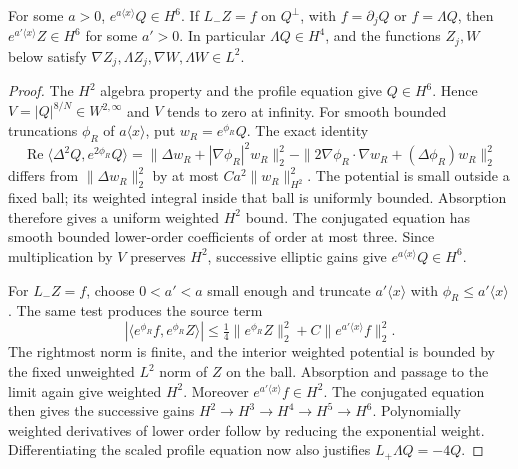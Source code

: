 \begin{lemma}
\label{lem:r13-dual-decay}
For some $a>0$, $e^{a\langle x\rangle}Q\in H^6$. If
$L_-Z=f$ on $Q^\perp$, with $f=\partial_jQ$ or $f=\Lambda Q$,
then $e^{a'\langle x\rangle}Z\in H^6$ for some $a'>0$.
In particular $\Lambda Q\in H^4$, and the functions $Z_j,W$ below
satisfy $\nabla Z_j,\Lambda Z_j,\nabla W,\Lambda W\in L^2$.
\end{lemma}
\begin{proof}
The $H^2$ algebra property and the profile equation give $Q\in H^6$.
Hence $V=|Q|^{8/N}\in W^{2,\infty}$ and $V$ tends to zero at infinity.
For smooth bounded truncations $\phi_R$ of $a\langle x\rangle$, put
$w_R=e^{\phi_R}Q$. The exact identity
\[
 \operatorname{Re}\langle\Delta^2Q,e^{2\phi_R}Q\rangle
 =\|\Delta w_R+|\nabla\phi_R|^2w_R\|_2^2
 -\|2\nabla\phi_R\cdot\nabla w_R+(\Delta\phi_R)w_R\|_2^2
\]
differs from $\|\Delta w_R\|_2^2$ by at most
$Ca^2\|w_R\|_{H^2}^2$. The potential is small outside a fixed ball;
its weighted integral inside that ball is uniformly bounded.
Absorption therefore gives a uniform weighted $H^2$ bound. The
conjugated equation has smooth bounded lower-order coefficients of
order at most three. Since multiplication by $V$ preserves $H^2$,
successive elliptic gains give
$e^{a\langle x\rangle}Q\in H^6$.

For $L_-Z=f$, choose $0<a'<a$ small enough and truncate
$a'\langle x\rangle$ with $\phi_R\le a'\langle x\rangle$.
The same test produces the source term
\[
 |\langle e^{\phi_R}f,e^{\phi_R}Z\rangle|
 \le \tfrac14\|e^{\phi_R}Z\|_2^2
      +C\|e^{a'\langle x\rangle}f\|_2^2.
\]
The rightmost norm is finite, and the interior weighted potential is
bounded by the fixed unweighted $L^2$ norm of $Z$ on the ball.
Absorption and passage to the limit again give weighted $H^2$.
Moreover $e^{a'\langle x\rangle}f\in H^2$. The conjugated equation
then gives the successive gains $H^2\to H^3\to H^4\to H^5\to H^6$.
Polynomially weighted derivatives of lower order follow by reducing
the exponential weight. Differentiating the scaled profile equation
now also justifies $L_+\Lambda Q=-4Q$.
\end{proof}

